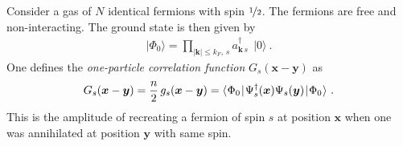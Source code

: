 \documentclass[11pt,a4paper]{article}
\newcommand{\abs}[1]{\lvert#1\rvert}
\newcommand{\ket}[1]{\lvert#1\rangle}
\newcommand{\matrixel}[3]{\langle\hspace{0.15mm}#1\hspace{0.25mm}\vert\hspace{0.25mm} #2
  \hspace{0.25mm}\vert\hspace{0.25mm}#3\hspace{0.15mm}\rangle}
\newcommand{\boldx}{{\boldsymbol x}}
\newcommand{\boldy}{{\boldsymbol y}}
\newcommand{\boldk}{{\boldsymbol k}}
\begin{document}
Consider a gas of $N$ identical fermions with spin $\nicefrac{1}{2}$. The fermions are free and non-interacting.
The ground state is then given by
\begin{align}
  \ket{\Phi_0} = \prod_{\abs\boldk\leqslant k_F,\,s}\!\!\!\! a_{\boldk\,s}^\dagger\:\ \ket0\ .
\end{align}
One defines the \emph{one-particle correlation function} $G_s(\boldx-\boldy)$ as
\begin{align}
  \label{eq:TwoPointCorrFunc}
  G_s(\boldx-\boldy) = \frac{n}{2}\,g_s(\boldx-\boldy)
  = \matrixel{\Phi_0}{\Psi_s^\dagger(\boldx)\Psi_s(\boldy)}{\Phi_0}\ .
\end{align}
This is the amplitude of recreating a fermion of spin $s$ at position $\boldx$ when one was annihilated
at position $\boldy$ with same spin.
\end{document}
